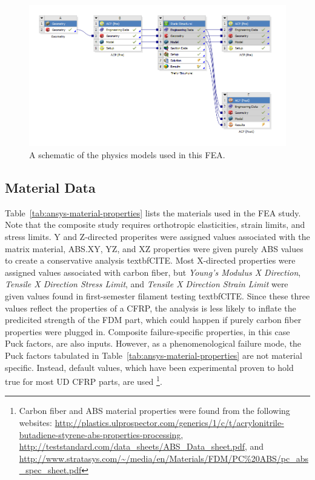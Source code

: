 \begin{figure}[htp]
\centering
\includegraphics[width=1\textwidth]{./figures/fea/fea-project-schematic}
\caption{A schematic of the physics models used in this FEA.}
\label{fig:fea-project-schematic}
\end{figure}

\clearpage

\subsection{Material Data}

\indent

Table~\ref{tab:ansys-material-properties} lists the materials used in the FEA study. Note that the composite study requires orthotropic elasticities, strain limits, and stress limits. Y and Z-directed properites were assigned values associated with the matrix material, ABS.XY, YZ, and XZ properties were given purely ABS values to create a conservative analysis \large{textbf{CITE}}. Most X-directed properties were assigned values associated with carbon fiber, but \textit{Young's Modulus X Direction}, \textit{Tensile X Direction Stress Limit}, and \textit{Tensile X Direction Strain Limit} were given values found in first-semester filament testing \large{textbf{CITE}}. Since these three values reflect the properties of a CFRP, the analysis is less likely to inflate the predicited strength of the FDM part, which could happen if purely carbon fiber properties were plugged in. Composite failure-specific properties, in this case Puck factors, are also inputs. However, as a phenomenological failure mode, the Puck factors tabulated in Table~\ref{tab:ansys-material-properties} are not material specific. Instead, default values, which have been experimental proven to hold true for most UD CFRP parts, are used \footnote{Carbon fiber and ABS material properties were found from the following websites: \url{http://plastics.ulprospector.com/generics/1/c/t/acrylonitrile-butadiene-styrene-abs-properties-processing}, \url{http://teststandard.com/data_sheets/ABS_Data_sheet.pdf}, and \url{http://www.stratasys.com/~/media/en/Materials/FDM/PC\%20ABS/pc_abs_spec_sheet.pdf}}.\\

